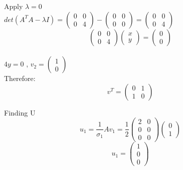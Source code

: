 \documentclass[12pt, oneside]{article}   	%
\begin{document}
\begin{enumerate}
	Apply $\lambda= 0$\\
	
	$det(A^TA- \lambda I)= \left( \begin{array}{cc} 0 & 0 \\ 0 & 4  \end{array} \right)- \left( \begin{array}{cc} 0 & 0 \\ 0 & 0  \end{array} \right) =\left( \begin{array}{cc} 0 & 0 \\ 0 & 4  \end{array} \right)$\\
	
	$$\left( \begin{array}{cc} 0 & 0 \\ 0 & 4 \end{array} \right) \left( \begin{array}{c} x \\ y \end{array} \right) =\left( \begin{array}{c} 0 \\ 0  \end{array} \right)$$ \\
	
	$4y=0$ , $v_2= \left( \begin{array}{c} 1 \\ 0  \end{array} \right)$\\
	Therefore: $$v^T=\left( \begin{array}{cc} 0 & 1 \\ 1 & 0  \end{array} \right)$$
	
	Finding U
	$$u_1= \frac{1}{\sigma_1}Av_1= \frac{1}{2}\left( \begin{array}{cc} 2&0 \\ 0& 0 \\0&0 \end{array} \right)\left( \begin{array}{c} 0\\ 1  \end{array} \right)$$
	$$u_1= \left( \begin{array}{c} 1 \\ 0 \\ 0 \end{array} \right)$$\\
	

\end{enumerate}
\end{document}
